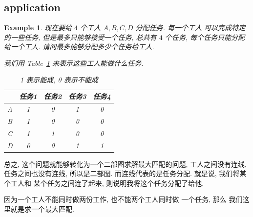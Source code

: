 \documentclass[a4paper, 10pt]{ctexart} %
\newtheorem{example}{Example}
\begin{document}
\subsection{application}
\begin{example}
现在要给 $4$ 个工人 $A,  B, C , D$ 分配任务. 每一个工人
可以完成特定的一些任务, 但是最多只能够接受一个任务, 
总共有 $4$ 个任务, 每个任务只能分配给一个工人. 
请问最多能够分配多少个任务给工人. 

我们用 Table~\ref{tab:tab1} 来表示这些工人能做什么任务.
\begin{table}
    \centering\begin{tabular}{||c c c c c||}
        \hline 
        & 任务1 & 任务2 &任务3  &任务4\\ [0.5ex]
        \hline \hline
        A &  1 & 0 & 1 & 0 \\
        \hline 
        B & 1 & 0 & 0 &  0 \\
        \hline 
        C & 1 & 1 & 0 & 0 \\
        \hline 
        D & 0 & 0 & 1 & 1 \\
        \hline
    \end{tabular}
    \caption{1 表示能成, 0 表示不能成}
    \label{tab:tab1}
\end{table}
\end{example}

总之, 这个问题就能够转化为一个二部图求解最大匹配的问题, 
工人之间没有连线, 任务之间也没有连线, 所以是二部图. 
而连线代表的是任务分配. 就是说, 我们将某个工人和
某个任务之间连了起来, 则说明我将这个任务分配了给他.

因为一个工人不能同时做两份工作, 也不能两个工人同时做
一个任务, 那么
我们这里就是求一个最大匹配. 
\end{document}
